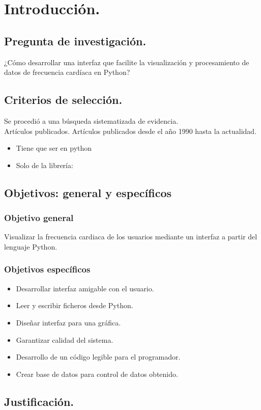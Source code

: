 \documentclass[14pt]{report}
\begin{document}
	\section{Introducción.}
		\subsection*{Pregunta de investigación.}
		¿Cómo desarrollar una interfaz que facilite la visualización y procesamiento de datos de frecuencia cardíaca en Python? 
		\subsection*{Criterios de selección.} Se procedió a una búsqueda sistematizada de evidencia. \\
		Artículos publicados. Artículos publicados desde el año 1990 hasta la actualidad.
		\begin{itemize}
			\item Tiene que ser en python
			\item Solo de la librería: 
		\end{itemize}
		\subsection*{Objetivos: general y específicos}
			\subsubsection{Objetivo general}
			Visualizar la frecuencia cardiaca de los usuarios mediante un interfaz a partir del lenguaje Python.
			\subsubsection{Objetivos específicos}
				\begin{itemize}
					\item Desarrollar interfaz amigable con el usuario.
					\item Leer y escribir ficheros desde Python. 
					\item Diseñar interfaz para una gráfica. 
					\item Garantizar calidad del sistema. 
					\item Desarrollo de un código legible para el programador.
					\item Crear base de datos para control de datos obtenido. 
				\end{itemize}
		\subsection*{Justificación.}
\end{document}
